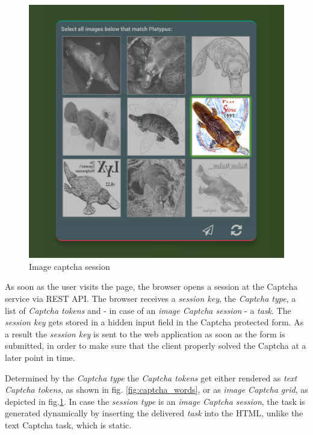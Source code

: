  \begin{figure}[H]
	\centering
	\includegraphics[width=0.8\linewidth]{content/figures/captcha_images.png}
	\caption{Image captcha session}
	\label{fig:captcha_images}
\end{figure}
 
 As soon as the user visits the page, the browser opens a session at the Captcha service via REST API. The browser receives a \textit{session key}, the \textit{Captcha type}, a list of \textit{Captcha tokens} and - in case of an \textit{image Captcha session} - a \textit{task}. The \textit{session key} gets stored in a hidden input field in the Captcha protected form. As a result the \textit{session key} is sent to the web application as soon as the form is submitted, in order to make sure that the client properly solved the Captcha at a later point in time. 
 
 Determined by the \textit{Captcha type} the \textit{Captcha tokens} get either rendered as \textit{text Captcha tokens}, as shown in fig. \ref{fig:captcha_words}, or as \textit{image Captcha grid}, as depicted in fig.\ref{fig:captcha_images}. In case the \textit{session type} is an \textit{image Captcha session}, the task is generated dynamically by inserting the delivered \textit{task} into the HTML, unlike the text Captcha task, which is static.
 
